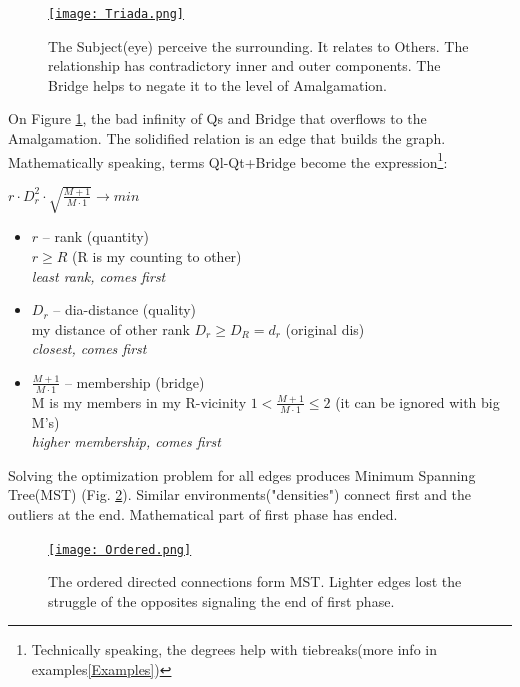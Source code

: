 \documentclass[12pt, a4paper, twocolumn]{article}
\newcommand{\githubPics}{https://raw.githubusercontent.com/artamono/druhg/master/papers/druhg/}
\begin{document}
\begin{figure}[H]
  \centering
  \href{\githubPics Triada.png}{\texttt{[image: Triada.png]}}
  \centering
  \caption{The Subject(eye) perceive the surrounding. It relates to Others. The relationship has contradictory inner and outer components. The Bridge helps to negate it to the level of Amalgamation.}
  \label{fig:Triad}
\end{figure}

On Figure \ref{fig:Triad}, the bad infinity of Qs and Bridge that overflows to the Amalgamation. The solidified relation is an edge that builds the graph. Mathematically speaking, terms Ql-Qt+Bridge become the expression\footnote{Technically speaking, the degrees help with tiebreaks(more info in examples\ref{Examples})}:
\vspace{\myvspace}

\centerline{$r \cdot D^2_r \cdot \sqrt{\frac{M+1}{M \cdot 1}} \rightarrow min$}
\begin{itemize}
\item $r$ -- rank (quantity)
   \\ $r \geq R$ (R is my counting to other)
   \\ \textit{least rank, comes first}

\item $D_r$ -- dia-distance (quality) 
   \\ my distance of other rank $D_r \geq D_R = d_r$ (original dis)
   \\ \textit{closest, comes first}

\item $\frac{M+1}{M \cdot 1}$ -- membership (bridge)
   \\ M is my members in my R-vicinity
   $1 < \frac{M+1}{M \cdot 1} \leq 2$ (it can be ignored with big M's)
   \\ \textit{higher membership, comes first}
\end{itemize}
Solving the optimization problem for all edges produces Minimum Spanning Tree(MST) (Fig. \ref{fig:Ordered}). Similar environments("densities") connect first and the outliers at the end. Mathematical part of first phase has ended.

\begin{figure}[H]
  \begin{minipage}[c]{0.40\linewidth}
    \href{\githubPics Ordered.png}{\texttt{[image: Ordered.png]}}
  \end{minipage}\hfill
  \begin{minipage}[c]{0.60\linewidth}
    \caption{The ordered directed connections form MST. Lighter edges lost the struggle of the opposites signaling the end of first phase.} \label{fig:Ordered}
  \end{minipage}
\end{figure}
\end{document}
